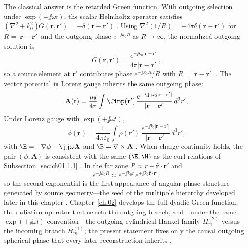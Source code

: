 The classical answer is the retarded Green function. With outgoing selection under $\exp(+\jj\omega t)$, the scalar Helmholtz operator satisfies
$(\nabla^2+k_0^2)G(\mathbf{r},\mathbf{r}')=-\delta(\mathbf{r}-\mathbf{r}')$
\cite{stratton1941,jackson1999}. Using $\nabla^2(1/R)=-4\pi\delta(\mathbf{r}-\mathbf{r}')$ for $R=|\mathbf{r}-\mathbf{r}'|$ and the outgoing phase $e^{-\jj k_0 R}$ as $R\to\infty$, the normalized outgoing solution is
\begin{equation}
\label{eq:ch1.scalar-green-outgoing}
G(\mathbf{r},\mathbf{r}')
=
\frac{e^{-\jj k_0|\mathbf{r}-\mathbf{r}'|}}{4\pi|\mathbf{r}-\mathbf{r}'|},
\end{equation}
so a source element at $\mathbf{r}'$ contributes phase $e^{-\jj k_0 R}/R$ with $R=|\mathbf{r}-\mathbf{r}'|$ \cite{stratton1941,jackson1999,tai1994}. The vector potential in Lorenz gauge inherits the same outgoing phase:
\begin{equation}
\label{eq:ch1.vector-potential-retarded}
\mathbf{A}(\mathbf{r})
=
\frac{\mu_0}{4\pi}\int
\Jimp(\mathbf{r}')\,
\frac{e^{-\jj k_0|\mathbf{r}-\mathbf{r}'|}}{|\mathbf{r}-\mathbf{r}'|}\,
d^3r',
\end{equation}
Under Lorenz gauge with $\exp(+\jj\omega t)$,
\begin{equation}
\label{eq:ch1.lorenz-scalar-potential-retarded}
\phi(\mathbf{r})
=
\frac{1}{4\pi\varepsilon_0}\int
\rho(\mathbf{r}')\,
\frac{e^{-\jj k_0|\mathbf{r}-\mathbf{r}'|}}{|\mathbf{r}-\mathbf{r}'|}\,
d^3r',
\end{equation}
with $\E=-\nabla\phi-\jj\omega\mathbf{A}$ and $\B=\nabla\times\mathbf{A}$ \cite{stratton1941,jackson1999}.
When charge continuity holds, the pair $(\phi,\mathbf{A})$ is consistent with the same $(\E,\H)$ as the curl relations of Subsection~\ref{sec:ch01.1.1} \cite{maxwell1873}. In the far zone $R\approx r-\hat{\mathbf{r}}\cdot\mathbf{r}'$ and
\begin{equation}
\label{eq:ch1.green-far-zone-phase}
e^{-\jj k_0 R}\approx e^{-\jj k_0 r}\,e^{+\jj k_0\hat{\mathbf{r}}\cdot\mathbf{r}'},
\end{equation}
so the second exponential is the first appearance of angular phase structure generated
by source geometry---the seed of the multipole hierarchy developed later in this chapter
\cite{stratton1941,jackson1999}. Chapter~\ref{ch:02} develops the full dyadic Green function, the radiation operator that selects the outgoing branch, and---under the same $\exp(+\jj\omega t)$ convention---the outgoing cylindrical Hankel family $H_m^{(2)}$ versus the incoming branch $H_m^{(1)}$; the present statement fixes only the causal outgoing spherical phase that every later reconstruction inherits \cite{harrington2001,tai1994,stratton1941}.

